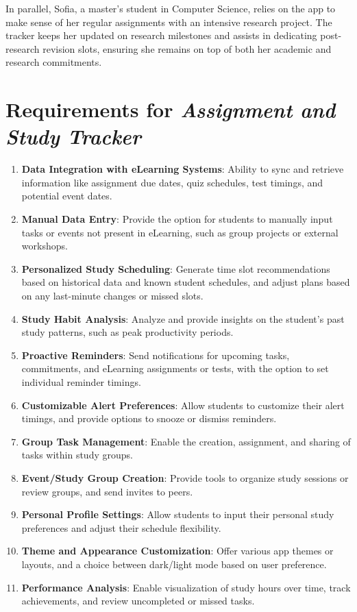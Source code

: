 \documentclass[12pt]{article}
\newcommand\projectname{\textit{Assignment and Study Tracker\ }}
\begin{document}
    In parallel, Sofia, a master's student in Computer Science, relies on the app to make sense of her regular assignments with an intensive research project. The tracker keeps her updated on research milestones and assists in dedicating post-research revision slots, ensuring she remains on top of both her academic and research commitments.

\section{Requirements for \projectname}
    \begin{enumerate}
        \item \textbf{Data Integration with eLearning Systems}: Ability to sync and retrieve information like assignment due dates, quiz schedules, test timings, and potential event dates.
        \item \textbf{Manual Data Entry}: Provide the option for students to manually input tasks or events not present in eLearning, such as group projects or external workshops.
        \item \textbf{Personalized Study Scheduling}: Generate time slot recommendations based on historical data and known student schedules, and adjust plans based on any last-minute changes or missed slots.
        \item \textbf{Study Habit Analysis}: Analyze and provide insights on the student's past study patterns, such as peak productivity periods.
        \item \textbf{Proactive Reminders}: Send notifications for upcoming tasks, commitments, and eLearning assignments or tests, with the option to set individual reminder timings.
        \item \textbf{Customizable Alert Preferences}: Allow students to customize their alert timings, and provide options to snooze or dismiss reminders.
        \item \textbf{Group Task Management}: Enable the creation, assignment, and sharing of tasks within study groups.
        \item \textbf{Event/Study Group Creation}: Provide tools to organize study sessions or review groups, and send invites to peers.
        \item \textbf{Personal Profile Settings}: Allow students to input their personal study preferences and adjust their schedule flexibility.
        \item \textbf{Theme and Appearance Customization}: Offer various app themes or layouts, and a choice between dark/light mode based on user preference.
        \item \textbf{Performance Analysis}: Enable visualization of study hours over time, track achievements, and review uncompleted or missed tasks.
    \end{enumerate}
\end{document}
